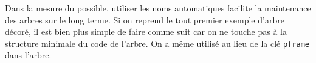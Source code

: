 \documentclass[12pt,a4paper]{article}
\begin{document}
\begin{remark}
	Dans la mesure du possible, utiliser les noms automatiques facilite la maintenance des arbres sur le long terme.
	Si on reprend le tout premier exemple d'arbre décoré, il est bien plus simple de faire comme suit car on ne touche pas à la structure minimale du code de l'arbre.
	On a même utilisé  au lieu de la clé \verb#pframe# dans l'arbre.

\end{remark}
\end{document}
